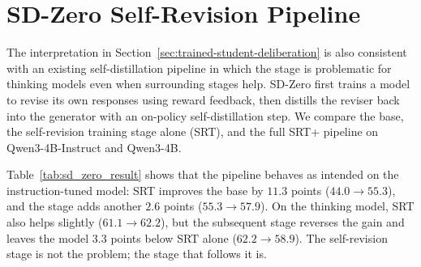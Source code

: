 \section{SD-Zero Self-Revision Pipeline}
\label{app:sd-zero-srt}

The interpretation in Section~\ref{sec:trained-student-deliberation} is also
consistent with an existing self-distillation pipeline in which the \opsd{} stage
is problematic for thinking models even when surrounding stages help. SD-Zero
\citep{he2026selfdistillationzero} first trains a model to revise its own
responses using reward feedback, then distills the reviser back into the
generator with an on-policy self-distillation step. We compare the base, the
self-revision training stage alone (SRT), and the full SRT+\opsd{} pipeline on
Qwen3-4B-Instruct and Qwen3-4B.



Table~\ref{tab:sd_zero_result} shows that the pipeline behaves as intended on
the instruction-tuned model: SRT improves the base by $11.3$ points
($44.0 \to 55.3$), and the \opsd{} stage adds another $2.6$ points
($55.3 \to 57.9$). On the thinking model, SRT also helps slightly
($61.1 \to 62.2$), but the subsequent \opsd{} stage reverses the gain and leaves
the model $3.3$ points below SRT alone ($62.2 \to 58.9$). The self-revision
stage is not the problem; the \opsd{} stage that follows it is.
